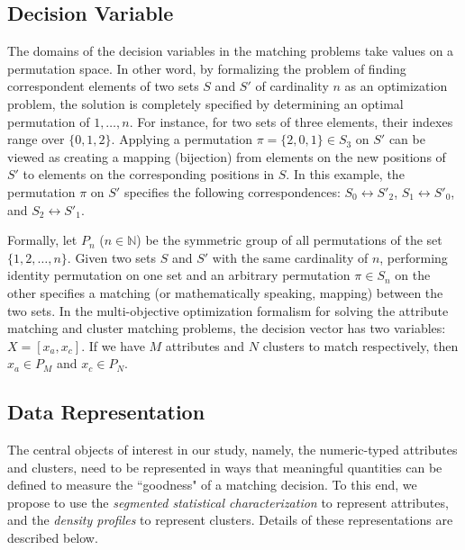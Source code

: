 \subsection{Decision Variable}
\label{sec:variables}
The domains of the decision variables in the matching problems take values on a permutation space. In other word, by formalizing the problem of finding correspondent elements of two sets $S$ and $S'$ of cardinality $n$ as an optimization problem, the solution is completely specified by determining an optimal permutation of ${1,\ldots,n}$. For instance, for two sets of three elements, their indexes range over $\{0, 1, 2\}$. Applying a permutation $\pi =\{2, 0, 1\} \in S_3$ on $S'$ can be viewed as creating a mapping (bijection) from elements on the new positions of $S'$ to elements on the corresponding positions in $S$. %
In this example, the permutation $\pi$ on $S'$ specifies the following correspondences: $S_0 \leftrightarrow S'_2$, $S_1 \leftrightarrow S'_0$, and $S_2 \leftrightarrow S'_1$.

Formally, let $P_n$ ($n\in \mathbb{N}$) be the symmetric group of all permutations of the set $\{1, 2, \ldots, n\}$. Given two sets $S$ and $S'$ with the same cardinality of $n$, performing identity permutation on one set and an arbitrary permutation $\pi \in S_n$ on the other specifies a matching (or mathematically speaking, mapping) between the two sets.
In the multi-objective optimization formalism for solving the attribute matching and cluster matching problems, the decision vector has two variables: $X=[x_a, x_c]$. If we have $M$ attributes and $N$ clusters to match respectively, then $x_a \in P_M$ and $x_c\in P_N$.


\subsection{Data Representation}
The central objects of interest in our study, namely, the numeric-typed attributes and clusters, need to be represented in ways that meaningful quantities can be defined to measure the ``goodness" of a matching decision. To this end, we propose to use the \emph{segmented statistical characterization} to represent attributes, and the \emph{density profiles} to represent clusters. Details of these representations are described below.

